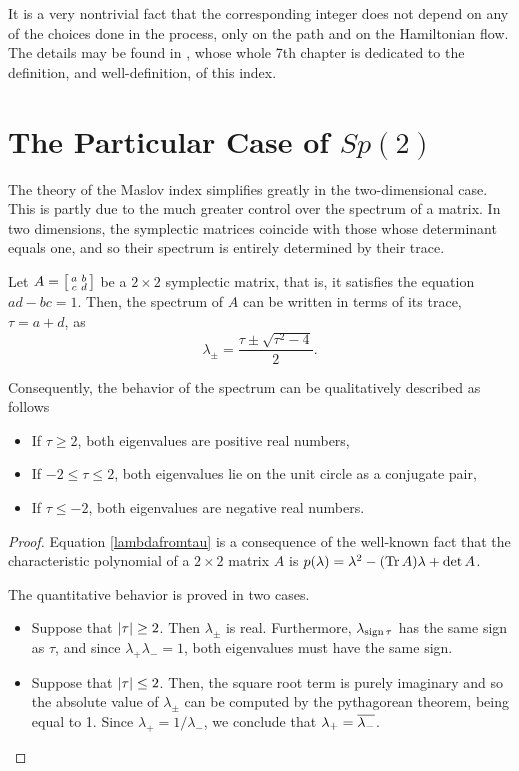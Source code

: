 It is a very nontrivial fact that the corresponding integer does not depend on any of the choices done in the process, only on the path and on the Hamiltonian flow. The details may be found in \cite{audin}, whose whole 7th chapter is dedicated to the definition, and well-definition, of this index.

\section{The Particular Case of $Sp(2)$}\label{sec:maslovsp2}

The theory of the Maslov index simplifies greatly in the two-dimensional case. This is partly due to the much greater control over the spectrum of a matrix. In two dimensions, the symplectic matrices coincide with those whose determinant equals one, and so their spectrum is entirely determined by their trace.

\begin{prop}
Let $A = \mleft[\begin{smallmatrix} a & b \\ c & d \end{smallmatrix}\mright]$ be a $2 \times 2$ symplectic matrix, that is, it satisfies the equation $ad - bc = 1$. Then, the spectrum of $A$ can be written in terms of its trace, $\tau = a+d$, as
\begin{equation}\label{lambdafromtau}
\lambda_\pm = \frac{\tau \pm \sqrt{\tau^2 - 4}}2.
\end{equation}

Consequently, the behavior of the spectrum can be qualitatively described as follows
\begin{itemize}
\item If $\tau \geq 2$, both eigenvalues are positive real numbers,
\item If $-2 \leq \tau \leq 2$, both eigenvalues lie on the unit circle as a conjugate pair,
\item If $\tau \leq -2$, both eigenvalues are negative real numbers.
\end{itemize}
\end{prop}

\begin{proof}
Equation \eqref{lambdafromtau} is a consequence of the well-known fact that the characteristic polynomial of a $2 \times 2$ matrix $A$ is $p(\lambda) = \lambda^2 - (\operatorname{Tr} A) \lambda + \det A$.

The quantitative behavior is proved in two cases.
\begin{itemize}
\item Suppose that $\lvert\tau\rvert \geq 2$. Then $\lambda_\pm$ is real. Furthermore, $\lambda_{\operatorname{sign} \tau}$ has the same sign as $\tau$, and since $\lambda_+ \lambda_- = 1$, both eigenvalues must have the same sign.
\item Suppose that $\lvert\tau\rvert \leq 2$. Then, the square root term is purely imaginary and so the absolute value of $\lambda_\pm$ can be computed by the pythagorean theorem, being equal to 1. Since $\lambda_+ = 1/\lambda_-$, we conclude that $\lambda_+ = \overline{\lambda_-}$.
\end{itemize}
\end{proof}

